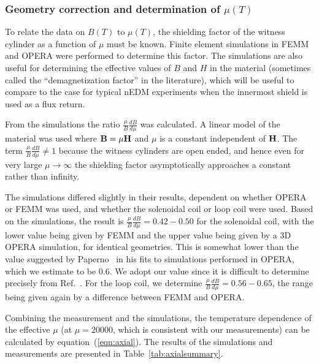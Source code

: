 




\subsubsection{Geometry correction and determination of $\mu(T)$\label{sec:axialsims}}

To relate the data on $B(T)$ to $\mu(T)$, the shielding factor of the
witness cylinder as a function of $\mu$ must be known.  Finite element
simulations in FEMM and OPERA were performed to determine this factor.
The simulations are also useful for determining the effective values
of $B$ and $H$ in the material (sometimes called the ``demagnetization
factor'' in the literature), which will be useful to compare to the
case for typical nEDM experiments when the innermost shield is used as
a flux return.


From the simulations the ratio $\frac{\mu}{B} \frac{dB}{d\mu}$ was
calculated.  A linear model of the material was used where
$\bold{B}=\mu \bold{H}$ and $\mu$ is a constant independent of
$\bold{H}$.  The term $\frac{\mu}{B}\frac{dB}{d\mu}\neq 1$ because the
witness cylinders are open ended, and hence even for very large
$\mu\rightarrow\infty$ the shielding factor asymptotically approaches
a constant rather than infinity.

The simulations differed slightly in their results, dependent on
whether OPERA or FEMM was used, and whether the solenoidal coil or
loop coil were used.
Based on the simulations, the result is
$\frac{\mu}{B}\frac{dB}{d\mu}=0.42-0.50$ for the solenoidal coil, with
the lower value being given by FEMM and the upper value being given by
a 3D OPERA simulation, for identical geometries.  This is somewhat
lower than the value suggested by
Paperno~\cite{bib:paperno-open-ended} in his fits to simulations
performed in OPERA, which we estimate to be 0.6.  We adopt our value
since it is difficult to determine precisely from
Ref.~\cite{bib:paperno-open-ended}.  For the loop coil, we determine
$\frac{\mu}{B}\frac{dB}{d\mu}=0.56-0.65$, the range being given again
by a difference between FEMM and OPERA.

Combining the measurement and the simulations, the temperature
dependence of the effective $\mu$ (at $\mu=20 000$, which is
consistent with our measurements) can be calculated by
equation~(\ref{eqn:axial}).  The results of the simulations and
measurements are presented in Table~\ref{tab:axialsummary}.

